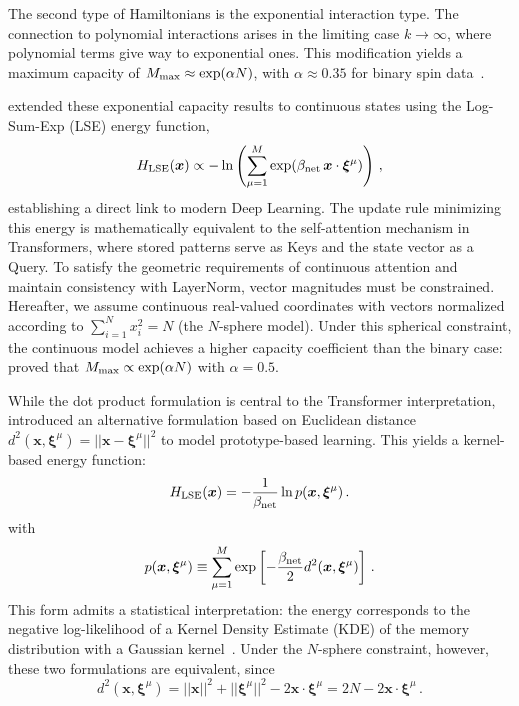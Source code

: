 \documentclass{article}
\theoremstyle{plain}
\theoremstyle{definition}
\theoremstyle{remark}
\begin{document}
The second type of Hamiltonians is the exponential interaction type. The connection to polynomial interactions arises in the limiting case $k \to \infty$, where polynomial terms give way to exponential ones. This modification yields a maximum capacity of $M_{\rm max} \approx \exp(\alpha N)$, with $\alpha \approx 0.35$ for binary spin data~\cite{demircigil2017model}.

\citet{ramsauer2021hopfield} extended these exponential capacity results to continuous states using the Log-Sum-Exp (LSE) energy function, 
\begin{equation}
    H_{\rm LSE}(\bm{x}) \propto -\ln \left( \sum_{\mu=1}^M \exp(\beta_{\rm net} \, \bm{x} \cdot \bm{\xi}^\mu) \right) \,,
    \label{eq:lse_energy}
\end{equation}
establishing a direct link to modern Deep Learning.
The update rule minimizing this energy is mathematically equivalent to the self-attention mechanism in Transformers, where stored patterns serve as Keys and the state vector as a Query. To satisfy the geometric requirements of continuous attention and maintain consistency with LayerNorm, vector magnitudes must be constrained. Hereafter, we assume continuous real-valued coordinates with vectors normalized according to $\sum_{i=1}^{N} x_i^2 = N$ (the $N$-sphere model). Under this spherical constraint, the continuous model achieves a higher capacity coefficient than the binary case: \citet{ramsauer2021hopfield} proved that $M_{\rm max} \propto \exp(\alpha N)$ with $\alpha = 0.5$.

While the dot product formulation is central to the Transformer interpretation, \citet{krotov2021large} introduced an alternative formulation based on Euclidean distance $d^2(\bm{x}, \bm{\xi}^\mu) = ||\bm{x}-\bm{\xi}^\mu||^2$ to model prototype-based learning. This yields a kernel-based energy function:
\begin{equation}
    H_{\rm LSE}(\bm{x}) = -\frac{1}{\beta_{\rm net}} \ln p(\bm{x}, \bm{\xi}^\mu) \,.
    \label{eq:H_lse}
\end{equation}
with 
\begin{equation}
    p(\bm{x}, \bm{\xi}^\mu) \equiv \sum_{\mu=1}^M \exp\left[ - \frac{\beta_{\rm net}}{2} d^2(\bm{x}, \bm{\xi}^\mu) \right] \,.
    \label{eq:dens}
\end{equation}
This form admits a statistical interpretation: the energy corresponds to the negative log-likelihood of a Kernel Density Estimate (KDE) of the memory distribution with a Gaussian kernel~\cite{hoover2025dense}. Under the $N$-sphere constraint, however, these two formulations are  equivalent, since 
\begin{equation}
    d^2(\bm{x}, \bm{\xi}^\mu) = ||\bm{x}||^2 + ||\bm{\xi}^\mu||^2 - 2\bm{x} \cdot \bm{\xi}^\mu = 2N - 2\bm{x} \cdot \bm{\xi}^\mu \,.
    \label{eq:edist}
\end{equation}
\end{document}
